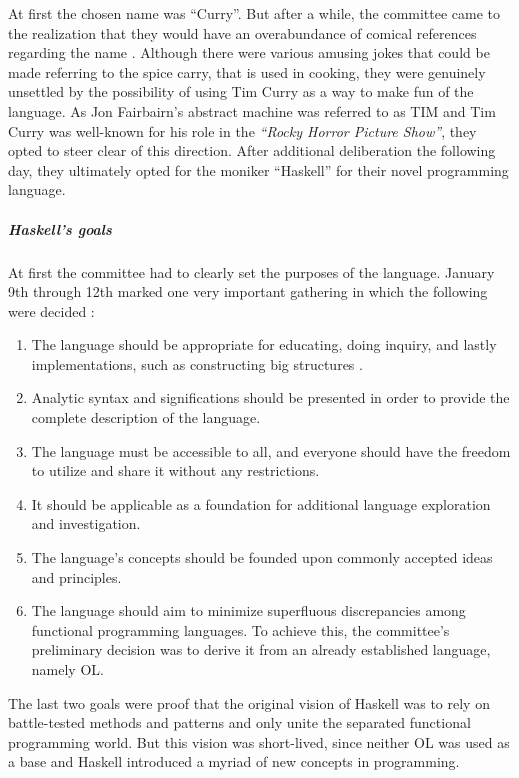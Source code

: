 \documentclass[a4paper, titlepage, twoside]{article}
\begin{document}
At first the chosen name was ``Curry''. But after a while, the committee came to the realization that they would have an overabundance of comical references regarding the name \autocite{hudakHistoryHaskellBeing2007}. Although there were various amusing jokes that could be made referring to the spice carry, that is used in cooking, they were genuinely unsettled by the possibility of using Tim Curry as a way to make fun of the language.
As Jon Fairbairn's abstract machine was referred to as TIM and Tim Curry was well-known for his role in the \emph{``Rocky Horror Picture Show''}, they opted to steer clear of this direction. After additional deliberation the following day, they ultimately opted for the moniker ``Haskell'' for their novel programming language.

\subparagraph*{Haskell's goals}
\label{sec:orgfc3f95f}

At first the committee had to clearly set the purposes of the language. January 9th through 12th marked one very important gathering in which the following were decided \autocite{hudakHistoryHaskellBeing2007}:

\begin{enumerate}
\item The language should be appropriate for educating, doing inquiry, and lastly implementations, such as constructing big structures .

\item Analytic syntax and significations should be presented in order to provide the complete description of the language.

\item The language must be accessible to all, and everyone should have the freedom to utilize and share it without any restrictions.

\item It should be applicable as a foundation for additional language exploration and investigation.

\item The language's concepts should be founded upon commonly accepted ideas and principles.

\item The language should aim to minimize superfluous discrepancies among functional programming languages. To achieve this, the committee's preliminary decision was to derive it from an already established language, namely OL.
\end{enumerate}

The last two goals were proof that the original vision of Haskell was to rely on battle-tested methods and patterns and only unite the separated functional programming world. But this vision was short-lived, since neither OL was used as a base and Haskell introduced a myriad of new concepts in programming.
\end{document}
